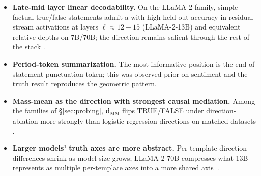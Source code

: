 \begin{itemize}
  \item \textbf{Late-mid layer linear decodability.} On the LLaMA-2
    family, simple factual true/false statements admit a 
    with high held-out accuracy in residual-stream activations at
    layers $\ell \approx 12\!-\!15$ (LLaMA-2-13B) and equivalent
    relative depths on 7B/70B; the direction remains salient through
    the rest of the stack \citep[\S 3, \S 4]{marks-tegmark-2023-truth}.
  \item \textbf{Period-token summarization.} The most-informative 
    position is the end-of-statement punctuation token; this
     was observed prior on sentiment
    \citep[\S 3, citing Tigges et al.\ 2023]{marks-tegmark-2023-truth}
    and the truth result reproduces the geometric pattern.
  \item \textbf{Mass-mean as the direction with strongest causal
    mediation.} Among the  families of \S\ref{sec:probing},
    $\mathbf{d}_\mathrm{MM}$ flips TRUE/FALSE under direction-ablation
    more strongly than logistic-regression directions on matched
    datasets \citep[\S 1, \S abstract]{marks-tegmark-2023-truth}.
  \item \textbf{Larger models' truth axes are more abstract.}
    Per-template direction differences shrink as model size grows;
    LLaMA-2-70B compresses what 13B represents as multiple per-template
    axes into a more shared axis~\citep[\S 4.1]{marks-tegmark-2023-truth}.
\end{itemize}

